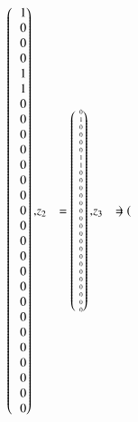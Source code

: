 \begin{beispiel}
{\begin{align*}
\begin{pmatrix*}[r]
\phantom{-}
 1\\
 0\\
 0\\
 0\\
 1\\
 1\\
 0\\
 0\\
 0\\
 0\\
 0\\
 0\\
 0\\
 0\\
 0\\
 0\\
 0\\
 0\\
 0\\
 0\\
 0\\
 0\\
 0\\
 0\\
 0\\
 0\\
 0
\end{pmatrix*},
&z_2
&=
\tiny
\begin{pmatrix*}[r]
\phantom{-}
 0\\
 1\\
 0\\
 0\\
 0\\
 0\\
 1\\
 1\\
 0\\
 0\\
 0\\
 0\\
 0\\
 0\\
 0\\
 0\\
 0\\
 0\\
 0\\
 0\\
 0\\
 0\\
 0\\
 0\\
 0\\
 0\\
 0
\end{pmatrix*},
&z_3
&=
\tiny
\begin{pmatrix*}[r]

\end{pmatrix*}
\end{align*}}
\end{beispiel}
